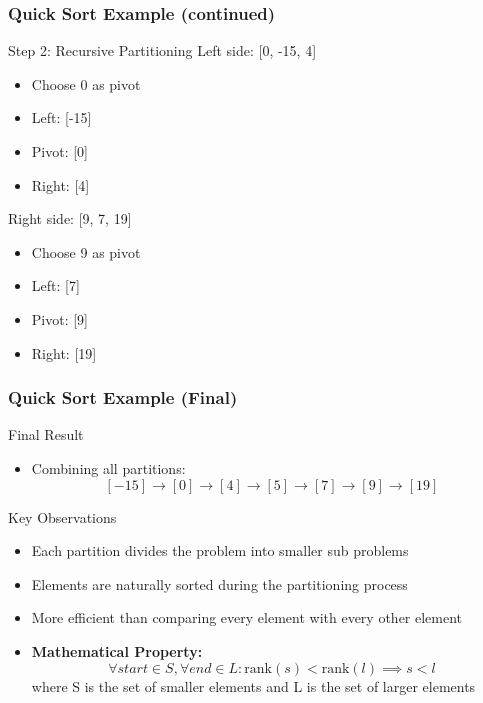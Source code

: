\begin{frame}
    \frametitle{Quick Sort Example (continued)}
    \begin{block}{Step 2: Recursive Partitioning}
        Left side: [0, -15, 4]
        \begin{itemize}
            \item Choose 0 as pivot
            \item Left: [-15]
            \item Pivot: [0]
            \item Right: [4]
        \end{itemize}
        
        Right side: [9, 7, 19]
        \begin{itemize}
            \item Choose 9 as pivot
            \item Left: [7]
            \item Pivot: [9]
            \item Right: [19]
        \end{itemize}
    \end{block}
\end{frame}


\begin{frame}
    \frametitle{Quick Sort Example (Final)}
    \begin{block}{Final Result}
        \begin{itemize}
            \item Combining all partitions:
            \[ [-15] \rightarrow [0] \rightarrow [4] \rightarrow [5] \rightarrow [7] \rightarrow [9] \rightarrow [19] \]
        \end{itemize}
    \end{block}
    
     \begin{alertblock}{Key Observations}
        \begin{itemize}
            \item Each partition divides the problem into smaller sub problems
            \item Elements are naturally sorted during the partitioning process
            \item More efficient than comparing every element with every other element
            \item \textbf{Mathematical Property:}
            \[ \forall  start \in S, \forall  end \in L: \text{rank}(s) < \text{rank}(l) \implies s < l \]
            where S is the set of smaller elements and L is the set of larger elements
        \end{itemize}
    \end{alertblock}
\end{frame}


